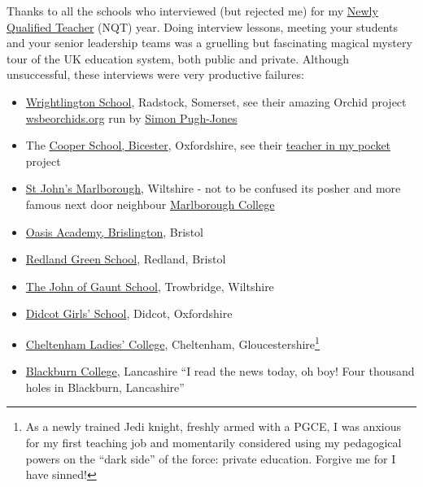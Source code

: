 \documentclass[
]{book}
\providecommand{\tightlist}{%
  \setlength{\itemsep}{0pt}\setlength{\parskip}{0pt}}
\begin{document}
Thanks to all the schools who interviewed (but rejected me) for my \href{https://en.wikipedia.org/wiki/Newly_qualified_teacher}{Newly Qualified Teacher} (NQT) year. Doing interview lessons, meeting your students and your senior leadership teams was a gruelling but fascinating magical mystery tour of the UK education system, both public and private. Although unsuccessful, these interviews were very productive failures:

\begin{itemize}
\tightlist
\item
  \href{https://en.wikipedia.org/wiki/Writhlington_School}{Wrightlington School}, Radstock, Somerset, see their amazing Orchid project \href{https://wsbeorchids.org/thirty-years-of-the-writhlington-schools-orchid-project-a-teachers-view-by-simon-pugh-jones/}{wsbeorchids.org} run by \href{https://www.bristol.ac.uk/graduation/honorary-degrees/honorary-graduates-2019/simon-pugh-jones/}{Simon Pugh-Jones}
\item
  The \href{https://en.wikipedia.org/wiki/Cooper_School,_Bicester}{Cooper School, Bicester}, Oxfordshire, see their \href{https://www.youtube.com/watch?v=XdywHl2ZA-I}{teacher in my pocket} project
\item
  \href{https://en.wikipedia.org/wiki/St_John\%27s_Marlborough}{St John's Marlborough}, Wiltshire - not to be confused its posher and more famous next door neighbour \href{https://en.wikipedia.org/wiki/Marlborough_College}{Marlborough College}
\item
  \href{https://en.wikipedia.org/wiki/Oasis_Academy_Brislington}{Oasis Academy, Brislington}, Bristol
\item
  \href{https://en.wikipedia.org/wiki/Redland_Green_School}{Redland Green School}, Redland, Bristol
\item
  \href{https://en.wikipedia.org/wiki/The_John_of_Gaunt_School}{The John of Gaunt School}, Trowbridge, Wiltshire
\item
  \href{https://en.wikipedia.org/wiki/Didcot_Girls\%27_School}{Didcot Girls' School}, Didcot, Oxfordshire
\item
  \href{https://en.wikipedia.org/wiki/Cheltenham_Ladies\%27_College}{Cheltenham Ladies' College}, Cheltenham, Gloucestershire\footnote{As a newly trained Jedi knight, freshly armed with a PGCE, I was anxious for my first teaching job and momentarily considered using my pedagogical powers on the ``dark side'' of the force: private education. \citep{nicebutdim} Forgive me for I have sinned!}
\item
  \href{https://en.wikipedia.org/wiki/Blackburn_College_(Blackburn_with_Darwen)}{Blackburn College}, Lancashire ``I read the news today, oh boy! Four thousand holes in Blackburn, Lancashire'' \citep{adayinthelife}
\end{itemize}
\end{document}
